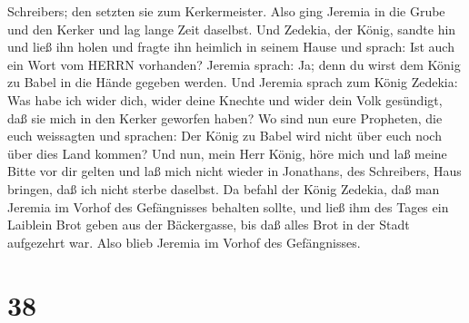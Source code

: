 Schreibers; den setzten sie zum Kerkermeister.  Also ging
Jeremia in die Grube und den Kerker und lag lange Zeit daselbst.
 Und Zedekia, der König, sandte hin und ließ ihn holen und
fragte ihn heimlich in seinem Hause und sprach: Ist auch ein Wort vom
HERRN vorhanden? Jeremia sprach: Ja; denn du wirst dem König zu Babel in
die Hände gegeben werden.  Und Jeremia sprach zum König
Zedekia: Was habe ich wider dich, wider deine Knechte und wider dein
Volk gesündigt, daß sie mich in den Kerker geworfen haben? 
Wo sind nun eure Propheten, die euch weissagten und sprachen: Der König
zu Babel wird nicht über euch noch über dies Land kommen? 
Und nun, mein Herr König, höre mich und laß meine Bitte vor dir gelten
und laß mich nicht wieder in Jonathans, des Schreibers, Haus bringen,
daß ich nicht sterbe daselbst.  Da befahl der König
Zedekia, daß man Jeremia im Vorhof des Gefängnisses behalten sollte, und
ließ ihm des Tages ein Laiblein Brot geben aus der Bäckergasse, bis daß
alles Brot in der Stadt aufgezehrt war. Also blieb Jeremia im Vorhof des
Gefängnisses.

\hypertarget{section-37}{%
\section{38}\label{section-37}}

